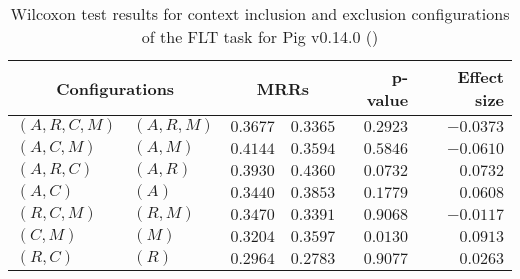 
\begin{table}
\begin{spacing}{1.2}
\centering
\caption{Wilcoxon test results for context inclusion and exclusion configurations of the FLT task for Pig v0.14.0 (\ctwo)}
\label{table:versus-wilcox-pig-flt-context}
\begin{tabular}{ll|rr|rr}
\toprule
      \multicolumn{2}{c|}{Configurations} &                \multicolumn{2}{c|}{MRRs} &             p-value & Effect size \\
\midrule
 $(A,R,C,M)$ &  $(A,R,M)$ &  $\bm{0.3677}$ &       $0.3365$ & $0.2923$ &   $-0.0373$ \\
   $(A,C,M)$ &    $(A,M)$ &  $\bm{0.4144}$ &       $0.3594$ & $0.5846$ &   $-0.0610$ \\
   $(A,R,C)$ &    $(A,R)$ &       $0.3930$ &  $\bm{0.4360}$ & $0.0732$ &    $0.0732$ \\
     $(A,C)$ &      $(A)$ &       $0.3440$ &  $\bm{0.3853}$ & $0.1779$ &    $0.0608$ \\
   $(R,C,M)$ &    $(R,M)$ &  $\bm{0.3470}$ &       $0.3391$ & $0.9068$ &   $-0.0117$ \\
     $(C,M)$ &      $(M)$ &       $0.3204$ &  $\bm{0.3597}$ & $0.0130$ &    $0.0913$ \\
     $(R,C)$ &      $(R)$ &  $\bm{0.2964}$ &       $0.2783$ & $0.9077$ &    $0.0263$ \\
\bottomrule
\end{tabular}

\end{spacing}
\end{table}

